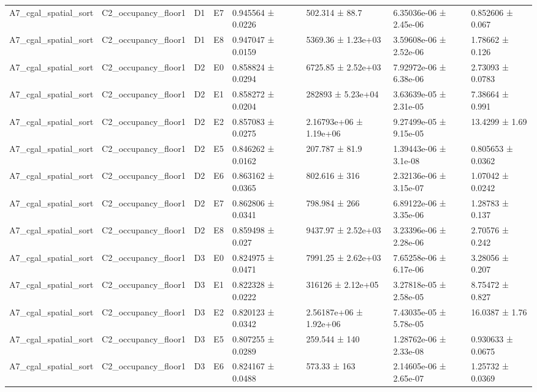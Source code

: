 \begin{table}
\begin{tabular}{lllllllll}
A7\_cgal\_spatial\_sort & C2\_occupancy\_floor1 & D1 & E7 & 0.945564 ± 0.0226 &  & 502.314 ± 88.7 & 6.35036e-06 ± 2.45e-06 & 0.852606 ± 0.067 \\
A7\_cgal\_spatial\_sort & C2\_occupancy\_floor1 & D1 & E8 & 0.947047 ± 0.0159 &  & 5369.36 ± 1.23e+03 & 3.59608e-06 ± 2.52e-06 & 1.78662 ± 0.126 \\
A7\_cgal\_spatial\_sort & C2\_occupancy\_floor1 & D2 & E0 & 0.858824 ± 0.0294 &  & 6725.85 ± 2.52e+03 & 7.92972e-06 ± 6.38e-06 & 2.73093 ± 0.0783 \\
A7\_cgal\_spatial\_sort & C2\_occupancy\_floor1 & D2 & E1 & 0.858272 ± 0.0204 &  & 282893 ± 5.23e+04 & 3.63639e-05 ± 2.31e-05 & 7.38664 ± 0.991 \\
A7\_cgal\_spatial\_sort & C2\_occupancy\_floor1 & D2 & E2 & 0.857083 ± 0.0275 &  & 2.16793e+06 ± 1.19e+06 & 9.27499e-05 ± 9.15e-05 & 13.4299 ± 1.69 \\
A7\_cgal\_spatial\_sort & C2\_occupancy\_floor1 & D2 & E5 & 0.846262 ± 0.0162 &  & 207.787 ± 81.9 & 1.39443e-06 ± 3.1e-08 & 0.805653 ± 0.0362 \\
A7\_cgal\_spatial\_sort & C2\_occupancy\_floor1 & D2 & E6 & 0.863162 ± 0.0365 &  & 802.616 ± 316 & 2.32136e-06 ± 3.15e-07 & 1.07042 ± 0.0242 \\
A7\_cgal\_spatial\_sort & C2\_occupancy\_floor1 & D2 & E7 & 0.862806 ± 0.0341 &  & 798.984 ± 266 & 6.89122e-06 ± 3.35e-06 & 1.28783 ± 0.137 \\
A7\_cgal\_spatial\_sort & C2\_occupancy\_floor1 & D2 & E8 & 0.859498 ± 0.027 &  & 9437.97 ± 2.52e+03 & 3.23396e-06 ± 2.28e-06 & 2.70576 ± 0.242 \\
A7\_cgal\_spatial\_sort & C2\_occupancy\_floor1 & D3 & E0 & 0.824975 ± 0.0471 &  & 7991.25 ± 2.62e+03 & 7.65258e-06 ± 6.17e-06 & 3.28056 ± 0.207 \\
A7\_cgal\_spatial\_sort & C2\_occupancy\_floor1 & D3 & E1 & 0.822328 ± 0.0222 &  & 316126 ± 2.12e+05 & 3.27818e-05 ± 2.58e-05 & 8.75472 ± 0.827 \\
A7\_cgal\_spatial\_sort & C2\_occupancy\_floor1 & D3 & E2 & 0.820123 ± 0.0342 &  & 2.56187e+06 ± 1.92e+06 & 7.43035e-05 ± 5.78e-05 & 16.0387 ± 1.76 \\
A7\_cgal\_spatial\_sort & C2\_occupancy\_floor1 & D3 & E5 & 0.807255 ± 0.0289 &  & 259.544 ± 140 & 1.28762e-06 ± 2.33e-08 & 0.930633 ± 0.0675 \\
A7\_cgal\_spatial\_sort & C2\_occupancy\_floor1 & D3 & E6 & 0.824167 ± 0.0488 &  & 573.33 ± 163 & 2.14605e-06 ± 2.65e-07 & 1.25732 ± 0.0369 \\

\end{tabular}
\end{table}
